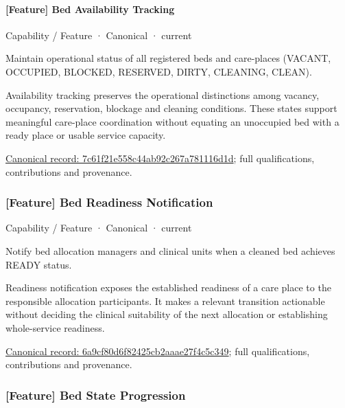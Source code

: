 \paragraph{[Feature] Bed Availability Tracking}

\label{element:7c61f21e558c44ab92c267a781116d1d}
{\small Capability / Feature · Canonical · current}\par

Maintain operational status of all registered beds and care-places (VACANT, OCCUPIED, BLOCKED, RESERVED, DIRTY, CLEANING, CLEAN).



Availability tracking preserves the operational distinctions among vacancy, occupancy, reservation, blockage and cleaning conditions. These states support meaningful care-place coordination without equating an unoccupied bed with a ready place or usable service capacity.


{\footnotesize \href{../../../../continuum/strategy/capability/feature/7c61f21e558c44ab92c267a781116d1d.md}{Canonical record: 7c61f21e558c44ab92c267a781116d1d}; full qualifications, contributions and provenance.}\par
\subsubsection{[Feature] Bed Readiness Notification}

\label{element:6a9cf80d6f82425cb2aaae27f4c5c349}
{\small Capability / Feature · Canonical · current}\par

Notify bed allocation managers and clinical units when a cleaned bed achieves READY status.



Readiness notification exposes the established readiness of a care place to the responsible allocation participants. It makes a relevant transition actionable without deciding the clinical suitability of the next allocation or establishing whole-service readiness.


{\footnotesize \href{../../../../continuum/strategy/capability/feature/6a9cf80d6f82425cb2aaae27f4c5c349.md}{Canonical record: 6a9cf80d6f82425cb2aaae27f4c5c349}; full qualifications, contributions and provenance.}\par
\subsubsection{[Feature] Bed State Progression}

